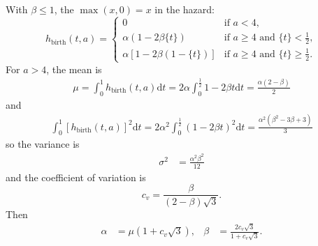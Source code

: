 \documentclass{article}
\newcommand{\md}{\mathrm{d}}
\begin{document}
With $\beta \leq 1$, the $\max(x, 0) = x$ in the hazard:
\begin{equation}
  h_{\text{birth}} (t, a) =
  \begin{cases}
    0 & \text{if $a < 4$},
    \\
    \alpha \left(1 - 2 \beta \{t\}\right)
    & \text{if $a \geq 4$ and $\{t\} < \frac{1}{2}$},
    \\
    \alpha \left[1 - 2 \beta (1 - \{t\})\right]
    & \text{if $a \geq 4$ and $\{t\} \geq \frac{1}{2}$}.
  \end{cases}
\end{equation}
For $a > 4$, the mean is
\begin{align}
  \mu = \int_0^1 h_{\text{birth}}(t, a) \md t
  = 2 \alpha \int_0^{\frac{1}{2}} 1 - 2 \beta t \md t
  = \frac{\alpha (2 - \beta)}{2}
\end{align}
and
\begin{align}
  \int_0^1 \left[h_{\text{birth}}(t, a)\right]^2 \md t
  = 2 \alpha^2 \int_0^{\frac{1}{2}} \left(1 - 2 \beta t\right)^2 \md t
  = \frac{\alpha^2 (\beta^2 - 3 \beta + 3)}{3}
\end{align}
so the variance is
\begin{align}
  \sigma^2
  &= \frac{\alpha^2 \beta^2}{12}
\end{align}
and the coefficient of variation is
\begin{equation}
  c_v = \frac{\beta}{(2 - \beta) \sqrt{3}}.
\end{equation}
Then
\begin{align}
  \alpha &= \mu \left(1 + c_v \sqrt{3}\right),
  &
  \beta &= \frac{2 c_v \sqrt{3}}{1 + c_v \sqrt{3}}.
\end{align}
\end{document}
